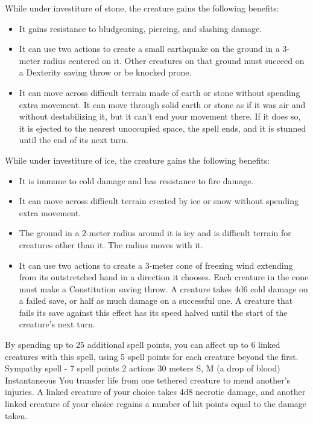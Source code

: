    While under investiture of stone, the creature gains the following benefits:
    \begin{itemize}
        \item It gains resistance to bludgeoning, piercing, and slashing damage.
        \item It can use two actions to create a small earthquake on the ground in a 3-meter radius centered on it.
        Other creatures on that ground must succeed on a Dexterity saving throw or be knocked prone.
        \item It can move across difficult terrain made of earth or stone without spending extra movement.
        It can move through solid earth or stone as if it was air and without destabilizing it, but it can't end your movement there.
        If it does so, it is ejected to the nearest unoccupied space, the spell ends, and it is stunned until the end of its next turn.
    \end{itemize}

    While under investiture of ice, the creature gains the following benefits:
    \begin{itemize}
        \item It is immune to cold damage and has resistance to fire damage.
        \item It can move across difficult terrain created by ice or snow without spending extra movement.
        \item The ground in a 2-meter radius around it is icy and is difficult terrain for creatures other than it.
        The radius moves with it.
        \item It can use two actions to create a 3-meter cone of freezing wind extending from its outstretched hand in a direction it chooses.
        Each creature in the cone must make a Constitution saving throw.
        A creature takes 4d6 cold damage on a failed save, or half as much damage on a successful one.
        A creature that fails its save against this effect has its speed halved until the start of the creature's next turn.
    \end{itemize}

    By spending up to 25 additional spell points, you can affect up to 6 linked creatures with this spell, using 5 spell points for each creature beyond the first.
    {Sympathy spell - 7 spell points}
    {2 actions}
    {30 meters}
    {S, M (a drop of blood)}
    {Instantaneous}
    You transfer life from one tethered creature to mend another's injuries.
    A linked creature of your choice takes 4d8 necrotic damage, and another linked creature of your choice regains a number of hit points equal to the damage taken.

